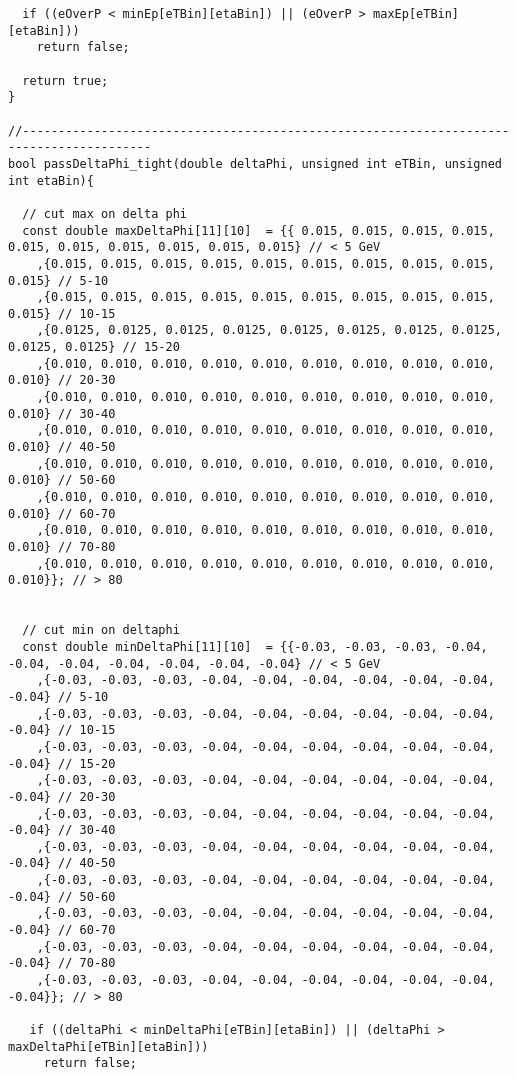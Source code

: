\begin{lstlisting}
  if ((eOverP < minEp[eTBin][etaBin]) || (eOverP > maxEp[eTBin][etaBin])) 
    return false;

  return true; 
}

//----------------------------------------------------------------------------------------
bool passDeltaPhi_tight(double deltaPhi, unsigned int eTBin, unsigned int etaBin){

  // cut max on delta phi
  const double maxDeltaPhi[11][10]  = {{ 0.015, 0.015, 0.015, 0.015, 0.015, 0.015, 0.015, 0.015, 0.015, 0.015} // < 5 GeV 
	,{0.015, 0.015, 0.015, 0.015, 0.015, 0.015, 0.015, 0.015, 0.015, 0.015} // 5-10 
	,{0.015, 0.015, 0.015, 0.015, 0.015, 0.015, 0.015, 0.015, 0.015, 0.015} // 10-15
	,{0.0125, 0.0125, 0.0125, 0.0125, 0.0125, 0.0125, 0.0125, 0.0125, 0.0125, 0.0125} // 15-20
	,{0.010, 0.010, 0.010, 0.010, 0.010, 0.010, 0.010, 0.010, 0.010, 0.010} // 20-30
	,{0.010, 0.010, 0.010, 0.010, 0.010, 0.010, 0.010, 0.010, 0.010, 0.010} // 30-40
	,{0.010, 0.010, 0.010, 0.010, 0.010, 0.010, 0.010, 0.010, 0.010, 0.010} // 40-50
	,{0.010, 0.010, 0.010, 0.010, 0.010, 0.010, 0.010, 0.010, 0.010, 0.010} // 50-60
	,{0.010, 0.010, 0.010, 0.010, 0.010, 0.010, 0.010, 0.010, 0.010, 0.010} // 60-70
	,{0.010, 0.010, 0.010, 0.010, 0.010, 0.010, 0.010, 0.010, 0.010, 0.010} // 70-80
	,{0.010, 0.010, 0.010, 0.010, 0.010, 0.010, 0.010, 0.010, 0.010, 0.010}}; // > 80 

                                     
  // cut min on deltaphi 
  const double minDeltaPhi[11][10]  = {{-0.03, -0.03, -0.03, -0.04, -0.04, -0.04, -0.04, -0.04, -0.04, -0.04} // < 5 GeV
	,{-0.03, -0.03, -0.03, -0.04, -0.04, -0.04, -0.04, -0.04, -0.04, -0.04} // 5-10 
	,{-0.03, -0.03, -0.03, -0.04, -0.04, -0.04, -0.04, -0.04, -0.04, -0.04} // 10-15
	,{-0.03, -0.03, -0.03, -0.04, -0.04, -0.04, -0.04, -0.04, -0.04, -0.04} // 15-20
	,{-0.03, -0.03, -0.03, -0.04, -0.04, -0.04, -0.04, -0.04, -0.04, -0.04} // 20-30
	,{-0.03, -0.03, -0.03, -0.04, -0.04, -0.04, -0.04, -0.04, -0.04, -0.04} // 30-40
	,{-0.03, -0.03, -0.03, -0.04, -0.04, -0.04, -0.04, -0.04, -0.04, -0.04} // 40-50
	,{-0.03, -0.03, -0.03, -0.04, -0.04, -0.04, -0.04, -0.04, -0.04, -0.04} // 50-60
	,{-0.03, -0.03, -0.03, -0.04, -0.04, -0.04, -0.04, -0.04, -0.04, -0.04} // 60-70
	,{-0.03, -0.03, -0.03, -0.04, -0.04, -0.04, -0.04, -0.04, -0.04, -0.04} // 70-80
	,{-0.03, -0.03, -0.03, -0.04, -0.04, -0.04, -0.04, -0.04, -0.04, -0.04}}; // > 80  
                               
   if ((deltaPhi < minDeltaPhi[eTBin][etaBin]) || (deltaPhi > maxDeltaPhi[eTBin][etaBin]))
     return false; 


\end{lstlisting}
